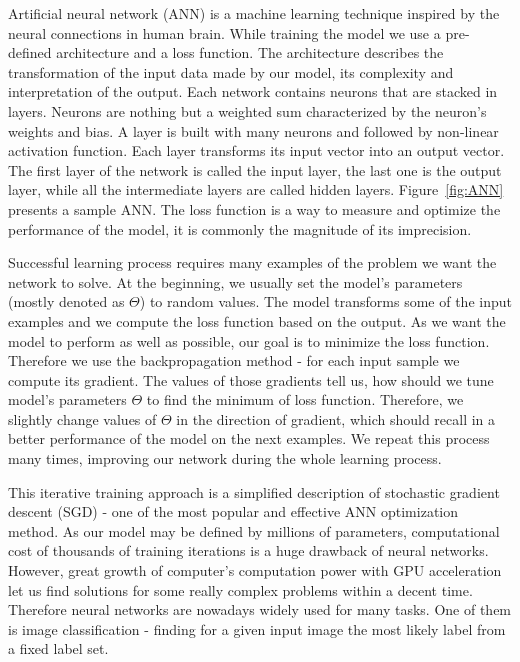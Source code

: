 \documentclass[shortabstract, inz, english]{iithesis}
\begin{document}
Artificial neural network (ANN) is a machine learning technique inspired by the neural connections in human brain. While training the model we use a pre-defined architecture and a loss function. The architecture describes the transformation of the input data made by our model, its complexity and interpretation of the output. Each network contains neurons that are stacked in layers. Neurons are nothing but a weighted sum characterized by the neuron's weights and bias. A layer is built with many neurons and followed by non-linear activation function. Each layer transforms its input vector into an output vector. The first layer of the network is called the input layer, the last one is the output layer, while all the intermediate layers are called hidden layers. Figure~\ref{fig:ANN} presents a sample ANN. The loss function is a way to measure and optimize the performance of the model, it is commonly the magnitude of its imprecision.
\par
Successful learning process requires many examples of the problem we want the network to solve. At the beginning, we usually set the model's parameters (mostly denoted as $\Theta$) to random values. The model transforms some of the input examples and we compute the loss function based on the output. As we want the model to perform as well as possible, our goal is to minimize the loss function. Therefore we use the backpropagation method - for each input sample we compute its gradient. The values of those gradients tell us, how should we tune model's parameters $\Theta$ to find the minimum of loss function. Therefore, we slightly change values of $\Theta$ in the direction of gradient, which should recall in a better performance of the model on the next examples. We repeat this process many times, improving our network during the whole learning process. 
\par
This iterative training approach is a simplified description of stochastic gradient descent (SGD) - one of the most popular and effective ANN optimization method. As our model may be defined by millions of parameters, computational cost of thousands of training iterations is a huge drawback of neural networks. However, great growth of computer's computation power with GPU acceleration let us find solutions for some really complex problems within a decent time.  Therefore neural networks are nowadays widely used for many tasks. One of them is image classification - finding for a given input image the most likely label from a fixed label set.
\end{document}
